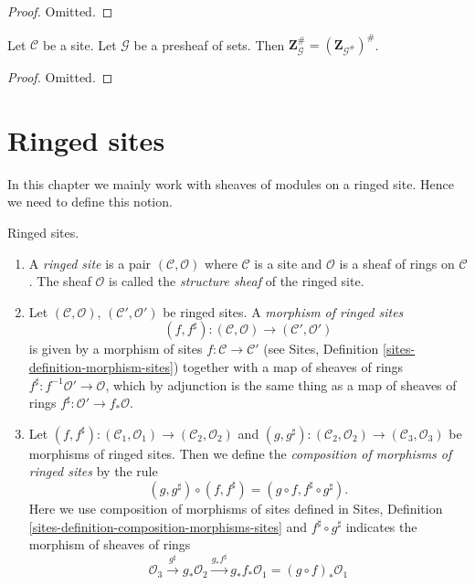 \begin{proof}
Omitted.
\end{proof}

\begin{lemma}
\label{lemma-may-sheafify-before-abelianize}
Let $\mathcal{C}$ be a site.
Let $\mathcal{G}$ be a presheaf of sets.
Then $\mathbf{Z}_{\mathcal{G}}^\# = (\mathbf{Z}_{\mathcal{G}^\#})^\#$.
\end{lemma}

\begin{proof}
Omitted.
\end{proof}








\section{Ringed sites}
\label{section-ringed-sites}

\noindent
In this chapter we mainly work with sheaves of modules on a ringed site.
Hence we need to define this notion.

\begin{definition}
\label{definition-ringed-site}
Ringed sites.
\begin{enumerate}
\item A {\it ringed site} is a pair $(\mathcal{C}, \mathcal{O})$
where $\mathcal{C}$ is a site and $\mathcal{O}$ is a sheaf of rings
on $\mathcal{C}$. The sheaf $\mathcal{O}$ is called the
{\it structure sheaf} of the ringed site.
\item Let $(\mathcal{C}, \mathcal{O})$, $(\mathcal{C}', \mathcal{O}')$ be ringed
sites. A {\it morphism of ringed sites}
$$
(f, f^\sharp) :
(\mathcal{C}, \mathcal{O})
\longrightarrow
(\mathcal{C}', \mathcal{O}')
$$
is given by a morphism of sites $f : \mathcal{C} \to \mathcal{C}'$
(see Sites, Definition \ref{sites-definition-morphism-sites})
together with a map of sheaves of rings
$f^\sharp : f^{-1}\mathcal{O}' \to \mathcal{O}$, which by adjunction
is the same thing as a map of sheaves of rings
$f^\sharp : \mathcal{O}' \to f_*\mathcal{O}$.
\item Let
$(f, f^\sharp) :
(\mathcal{C}_1, \mathcal{O}_1) \to (\mathcal{C}_2, \mathcal{O}_2)$ and
$(g, g^\sharp) :
(\mathcal{C}_2, \mathcal{O}_2) \to (\mathcal{C}_3, \mathcal{O}_3)$
be morphisms of ringed sites. Then we define
the {\it composition of morphisms of ringed sites}
by the rule
$$
(g, g^\sharp) \circ (f, f^\sharp) = (g \circ f, f^\sharp \circ g^\sharp).
$$
Here we use composition of morphisms of sites defined in
Sites, Definition \ref{sites-definition-composition-morphisms-sites}
and $f^\sharp \circ g^\sharp$ indicates the morphism of sheaves of
rings
$$
\mathcal{O}_3 \xrightarrow{g^\sharp} g_*\mathcal{O}_2
\xrightarrow{g_*f^\sharp} g_*f_*\mathcal{O}_1 = (g \circ f)_*\mathcal{O}_1
$$
\end{enumerate}
\end{definition}






